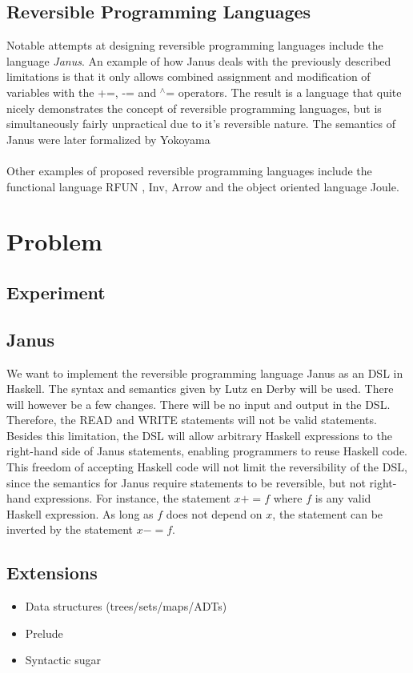 \documentclass[12pt,a4paper]{article}
\begin{document}
\subsection{Reversible Programming Languages}
Notable attempts at designing reversible programming languages include the language \textit{Janus}\cite{lutz82}. An example of how Janus deals with the previously described limitations is that it only allows combined assignment and modification of variables with the +=, -= and $^\land$= operators. The result is a language that quite nicely demonstrates the concept of reversible programming languages, but is simultaneously fairly unpractical due to it's reversible nature. The semantics of Janus were later formalized by Yokoyama\cite{yokoyama10} \\ \\
Other examples of proposed reversible programming languages include the functional language RFUN \cite{yokoyama11}\cite{thomsen15}, Inv\cite{hu04}, Arrow\cite{rose15} and the object oriented language Joule\cite{shultz16}.

\section{Problem}
	\subsection{Experiment}
	
	\subsection{Janus}
	We want to implement the reversible programming language Janus as an DSL in Haskell. The syntax and semantics given by Lutz en Derby \cite{r:lutz-derby1982} will be used. There will however be a few changes. There will be no input and output in the DSL. Therefore, the READ and WRITE statements will not be valid statements. Besides this limitation, the DSL will allow arbitrary Haskell expressions to the right-hand side of Janus statements, enabling programmers to reuse Haskell code. This freedom of accepting Haskell code will not limit the reversibility of the DSL, since the semantics for Janus require statements to be reversible, but not right-hand expressions. For instance, the statement $x += f$ where $f$ is any valid Haskell expression. As long as $f$ does not depend on $x$, the statement can be inverted by the statement $x -= f$.
	
	\subsection{Extensions}
	\begin{itemize}
		\item{Data structures (trees/sets/maps/ADTs)}
		\item{Prelude}
		\item{Syntactic sugar}
	\end{itemize}
	
\end{document}
